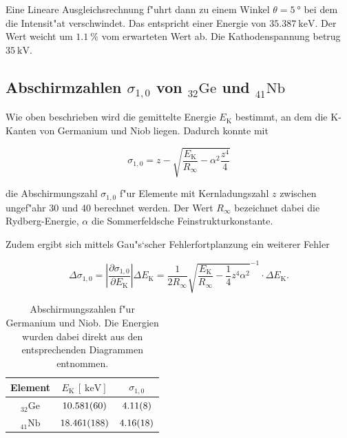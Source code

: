 		Eine Lineare Ausgleichsrechnung f"uhrt dann zu einem Winkel $\theta = \SI{5}{\degree}$ bei dem die Intensit"at verschwindet.
		Das entspricht einer Energie von $\SI{35.387}{\kilo \electronvolt}$. Der Wert weicht um $\SI{1.1}{\percent}$ vom erwarteten Wert ab. Die Kathodenspannung betrug $\SI{35}{\kilo \volt}$.

	\subsection{Abschirmzahlen $\sigma_{1,0}$ von ${}_{32}^{}\mathrm{Ge}$ und ${}_{41}^{}\mathrm{Nb}$}
		\label{subsec:abschirm1}
		Wie oben beschrieben wird die gemittelte Energie $E_\mathrm{K}$ bestimmt, an dem die K-Kanten von Germanium und Niob liegen. 
		Dadurch konnte mit 

		\begin{equation}
			\sigma_{1,0} = z - \sqrt{\frac{E_\mathrm{K}}{R_\infty} - \alpha^2 \frac{z^4}{4}} \nonumber
		\end{equation}

		die Abschirmungszahl $\sigma_{1,0}$ f"ur Elemente mit Kernladungszahl $z$ zwischen ungef"ahr 30 und 40 berechnet werden.
		Der Wert $R_\infty$ bezeichnet dabei die Rydberg-Energie, $\alpha$ die Sommerfeldsche Feinstrukturkonstante.

		Zudem ergibt sich mittels Gau"s`scher Fehlerfortplanzung ein weiterer Fehler

		\begin{equation}
			\Delta \sigma_{1,0} = \left| \frac{\partial \sigma_{1,0}}{\partial E_\mathrm{K}} \right| \Delta E_\mathrm{K} =
			\frac{1}{2 R_{\infty}} \sqrt{\frac{E_\mathrm{K}}{R_\infty} - \frac{1}{4} z^4 \alpha^2}^{-1}
			\cdot \Delta E_\mathrm{K} . \nonumber
		\end{equation}

		\begin{table}[h!]
			\centering
				\caption{Abschirmungszahlen f"ur Germanium und Niob. Die Energien wurden dabei direkt aus den entsprechenden Diagrammen entnommen.}
			\begin{tabular}{|c|c|c|}
				\hline
				Element & 
				$E_\mathrm{K}\,[\SI{}{\kilo \electronvolt}]$ & 
				$\sigma_{1,0}$ \\
				\hline \hline
				${}_{32}^{}\mathrm{Ge}$ & $\SI{10.581 (60)}{}$ & $\SI{4.11 (8)}{}$ \\
				${}_{41}^{}\mathrm{Nb}$ & $\SI{18.461 (188)}{}$ & $\SI{4.16 (18)}{}$ \\
				\hline
			\end{tabular}
		\end{table}

